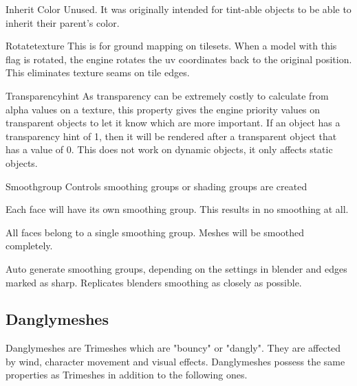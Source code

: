 \begin{propertyAurora}{Inherit Color}
Unused. It was originally intended for tint-able objects to be 
able to inherit their parent's color.
\end{propertyAurora}

\begin{propertyAurora}{Rotatetexture}
This is for ground mapping on tilesets. When a model with
this flag is rotated, the engine rotates the uv coordinates back 
to the original position. This eliminates texture seams on tile edges.
\end{propertyAurora}

\begin{propertyAurora}{Transparencyhint}
As transparency can be extremely costly to calculate from alpha values on a
texture, this property gives the engine priority values on transparent objects to let it
know which are more important. If an object has a transparency hint of 1, then it
will be rendered after a transparent object that has a value of 0. This does not work 
on dynamic objects, it only affects static objects.
\end{propertyAurora}

\begin{propertyAurora}{Smoothgroup}
Controls smoothing groups or shading groups are created
\begin{description}[leftmargin=6em,style=nextline]
    \item[Separate] Each face will have its own smoothing group. This results in no smoothing at all.
    \item[Single] All faces belong to a single smoothing group. Meshes will be smoothed completely.
    \item[Auto] Auto generate smoothing groups, depending on the settings in blender and edges marked as sharp. Replicates blenders smoothing as closely as possible.
\end{description}
\end{propertyAurora}


\subsection{Danglymeshes}

\begin{minipage}[t]{0.65\textwidth}
    Danglymeshes are Trimeshes which are "bouncy" or "dangly". They are affected by
    wind, character movement and visual effects. Danglymeshes possess the same 
    properties as Trimeshes in addition to the following ones.
\end{minipage}\hfill
\begin{minipage}[t]{0.3\textwidth}
    \centering{}
    \label{fig1}
\end{minipage}

